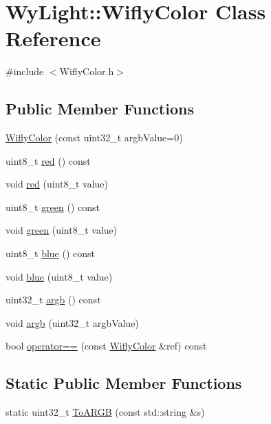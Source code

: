 \hypertarget{class_wy_light_1_1_wifly_color}{\section{Wy\-Light\-:\-:Wifly\-Color Class Reference}
\label{class_wy_light_1_1_wifly_color}
}


{\ttfamily \#include $<$Wifly\-Color.\-h$>$}

\subsection*{Public Member Functions}
\begin{DoxyCompactItemize}
\item 
\hyperlink{class_wy_light_1_1_wifly_color_a80fdd37a1541dd652860ea3156bf72ea}{Wifly\-Color} (const uint32\-\_\-t argb\-Value=0)
\item 
uint8\-\_\-t \hyperlink{class_wy_light_1_1_wifly_color_a3e82f59485585bbb227596fe96ba9dbf}{red} () const 
\item 
void \hyperlink{class_wy_light_1_1_wifly_color_a6ce3ce1c62b4a2ac87ce8c390170ce94}{red} (uint8\-\_\-t value)
\item 
uint8\-\_\-t \hyperlink{class_wy_light_1_1_wifly_color_a5d6277a101939c582de9538765e3489e}{green} () const 
\item 
void \hyperlink{class_wy_light_1_1_wifly_color_a9bc2caea718573d58d9c1a3951cd5d79}{green} (uint8\-\_\-t value)
\item 
uint8\-\_\-t \hyperlink{class_wy_light_1_1_wifly_color_a2c95d36931e4904838cc07cbc8e0556a}{blue} () const 
\item 
void \hyperlink{class_wy_light_1_1_wifly_color_a921dcca5daed2301aaf98b6e08b3f522}{blue} (uint8\-\_\-t value)
\item 
uint32\-\_\-t \hyperlink{class_wy_light_1_1_wifly_color_ab7e53732ecb04513ddd62cd5ee9baaad}{argb} () const 
\item 
void \hyperlink{class_wy_light_1_1_wifly_color_ac5cae0bdf5e5ebf7d5bfe1223d03169a}{argb} (uint32\-\_\-t argb\-Value)
\item 
bool \hyperlink{class_wy_light_1_1_wifly_color_aef5d10538a0dd9a18705e2b54372086a}{operator==} (const \hyperlink{class_wy_light_1_1_wifly_color}{Wifly\-Color} \&ref) const 
\end{DoxyCompactItemize}
\subsection*{Static Public Member Functions}
\begin{DoxyCompactItemize}
\item 
static uint32\-\_\-t \hyperlink{class_wy_light_1_1_wifly_color_aaf4a27a7197e7704848bf758f03557f3}{To\-A\-R\-G\-B} (const std\-::string \&s)
\end{DoxyCompactItemize}

